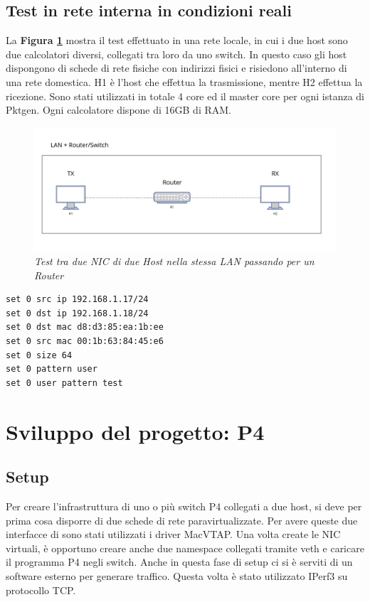 \subsection*{Test in rete interna in condizioni reali}
La \textbf{{Figura \ref{fig:dpdk_lan2}}} mostra il test effettuato in una rete locale, in cui i due host sono due calcolatori diversi, collegati tra loro da uno switch. In questo caso gli host dispongono di schede di rete fisiche con indirizzi fisici e risiedono all'interno di una rete domestica. H1 è l'host che effettua la trasmissione, mentre H2 effettua la ricezione. Sono stati utilizzati in totale 4 core ed il master core per ogni istanza di Pktgen. Ogni calcolatore dispone di 16GB di RAM.
\FloatBarrier
\begin{figure}[h]
\includegraphics[scale=0.5]{images/dpdk_lan2.png}
\centering
\caption{\textit{Test tra due NIC di due Host nella stessa LAN passando per un Router}}
\vspace{1cm}
\label{fig:dpdk_lan2}
\end{figure}
\FloatBarrier



\begin{verbatim}
set 0 src ip 192.168.1.17/24
set 0 dst ip 192.168.1.18/24
set 0 dst mac d8:d3:85:ea:1b:ee
set 0 src mac 00:1b:63:84:45:e6
set 0 size 64
set 0 pattern user
set 0 user pattern test
\end{verbatim}


\section*{Sviluppo del progetto: P4}

\subsection*{Setup}
Per creare l'infrastruttura di uno o più switch P4 collegati a due host, si deve per prima cosa disporre di due schede di rete paravirtualizzate. Per avere queste due interfacce di sono stati utilizzati i driver MacVTAP. Una volta create le NIC virtuali, è opportuno creare anche due namespace collegati tramite veth e caricare il programma P4 negli switch. Anche in questa fase di setup ci si è serviti di un software esterno per generare traffico. Questa volta è stato utilizzato IPerf3 \cite{noauthor_iperf_nodate} su protocollo TCP.


